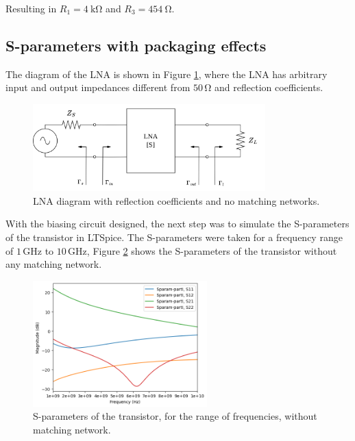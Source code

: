 Resulting in $R_1 = \SI{4}{\kilo\ohm}$ and $R_3 = \SI{454}{\ohm}$.

\subsection{S-parameters with packaging effects}

The diagram of the LNA is shown in Figure \ref{fig:LNA-diagram}, where the LNA has arbitrary input and output impedances different from $50\,\si{\ohm}$ and reflection coefficients.

\begin{figure}[H]
    \centering
    \includegraphics[width=0.8\textwidth]{Images/LNA-diagram-no-match.png}
    \caption{LNA diagram with reflection coefficients and no matching networks.}
    \label{fig:LNA-diagram}
\end{figure}

With the biasing circuit designed, the next step was to simulate the S-parameters of the transistor in LTSpice.  The S-parameters were taken for a frequency range of $1\,\si{\giga\hertz}$ to $10\,\si{\giga\hertz}$, Figure \ref{fig:withoutmathing} shows the S-parameters of the transistor without any matching network.

\begin{figure}[H]
    \centering
    \includegraphics[width=0.6\textwidth]{Images/without-matching.png}
    \caption{S-parameters of the transistor, for the range of frequencies, without matching network.}
    \label{fig:withoutmathing}
\end{figure}



